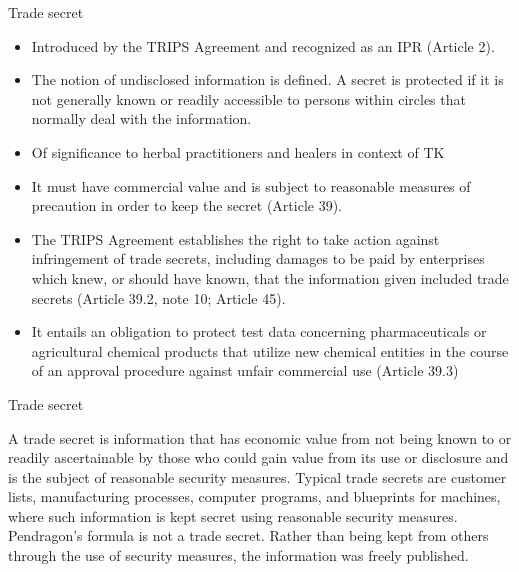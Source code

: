 \documentclass[ignorenonframetext,aspectratio=169]{beamer}
\providecommand{\tightlist}{%
  \setlength{\itemsep}{0pt}\setlength{\parskip}{0pt}}
\begin{document}
\begin{frame}{Trade secret}
\protect\hypertarget{trade-secret}{}

\begin{itemize}
\tightlist
\item
  Introduced by the TRIPS Agreement and recognized as an IPR (Article
  2).
\item
  The notion of undisclosed information is defined. A secret is
  protected if it is not generally known or readily accessible to
  persons within circles that normally deal with the information.
\item
  Of significance to herbal practitioners and healers in context of TK
\item
  It must have commercial value and is subject to reasonable measures of
  precaution in order to keep the secret (Article 39).
\item
  The TRIPS Agreement establishes the right to take action against
  infringement of trade secrets, including damages to be paid by
  enterprises which knew, or should have known, that the information
  given included trade secrets (Article 39.2, note 10; Article 45).
\item
  It entails an obligation to protect test data concerning
  pharmaceuticals or agricultural chemical products that utilize new
  chemical entities in the course of an approval procedure against
  unfair commercial use (Article 39.3)
\end{itemize}

\end{frame}

\begin{frame}{Trade secret}
\protect\hypertarget{trade-secret-1}{}

A trade secret is information that has economic value from not being
known to or readily ascertainable by those who could gain value from its
use or disclosure and is the subject of reasonable security measures.
Typical trade secrets are customer lists, manufacturing processes,
computer programs, and blueprints for machines, where such information
is kept secret using reasonable security measures. Pendragon's formula
is not a trade secret. Rather than being kept from others through the
use of security measures, the information was freely published.

\end{frame}
\end{document}
